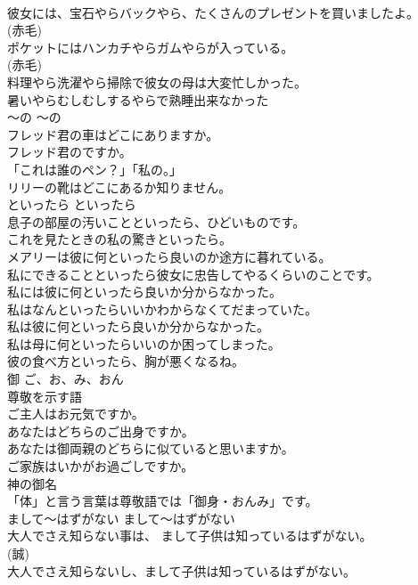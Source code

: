 \documentclass[8pt]{extreport}
\begin{document}
\begin{CJK}{UTF8}{min}
\\	彼女には、宝石やらバックやら、たくさんのプレゼントを買いましたよ。  
\\	(赤毛)
\\	ポケットにはハンカチやらガムやらが入っている。  
\\	(赤毛)
\\	料理やら洗濯やら掃除で彼女の母は大変忙しかった。   
\\	暑いやらむしむしするやらで熟睡出来なかった  
\\	〜の	〜の	
\\	フレッド君の車はどこにありますか。
\\	フレッド君のですか。
\\	「これは誰のペン？」「私の。」
\\	リリーの靴はどこにあるか知りません。  
\\	といったら	といったら	
\\	息子の部屋の汚いことといったら、ひどいものです。   
\\	これを見たときの私の驚きといったら。  
\\	メアリーは彼に何といったら良いのか途方に暮れている。   
\\	私にできることといったら彼女に忠告してやるくらいのことです。   
\\	私には彼に何といったら良いか分からなかった。   
\\	私はなんといったらいいかわからなくてだまっていた。   
\\	私は彼に何といったら良いか分からなかった。   
\\	私は母に何といったらいいのか困ってしまった。   
\\	彼の食べ方といったら、胸が悪くなるね。   
\\	御	ご、お、み、おん	
\\	尊敬を示す語	
\\	ご主人はお元気ですか。
\\	あなたはどちらのご出身ですか。
\\	あなたは御両親のどちらに似ていると思いますか。  
\\	ご家族はいかがお過ごしですか。  
\\	神の御名  
\\	「体」と言う言葉は尊敬語では「御身・おんみ」です。  
\\	まして〜はずがない	まして〜はずがない	
\\	大人でさえ知らない事は、 まして子供は知っているはずがない。  
\\	(誠)
\\	大人でさえ知らないし、まして子供は知っているはずがない。  

\end{CJK}
\end{document}
